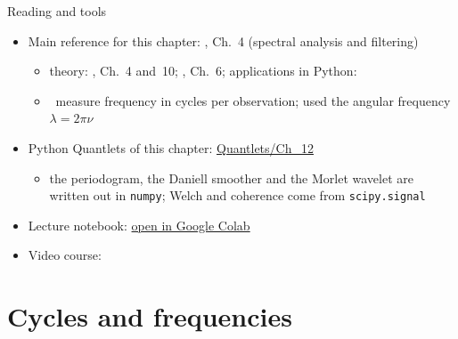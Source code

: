 \begin{frame}{Reading and tools}
\itemsize{\small}
\begin{itemize}
    \item Main reference for this chapter: , Ch.~4 (spectral analysis and filtering)
    \begin{itemize}
        \item theory: , Ch.~4 and~10; , Ch.~6; applications in Python: 
        \item {}\ measure frequency in cycles per observation;  used the angular frequency $\lambda = 2\pi\nu$
    \end{itemize}
    \item Python Quantlets of this chapter: \href{https://github.com/danpele/Time-Series-Analysis/tree/main/Quantlets/Ch_12}{Quantlets/Ch\_12}
    \begin{itemize}
        \item the periodogram, the Daniell smoother and the Morlet wavelet are written out in \texttt{numpy}; Welch and coherence come from \texttt{scipy.signal}
    \end{itemize}
    \item Lecture notebook: \href{\colaburl{notebooks/EN/chapter12_lecture_notebook.ipynb}}{open in Google Colab}
    \item Video course: 
\end{itemize}
\end{frame}


\section{Cycles and frequencies}

